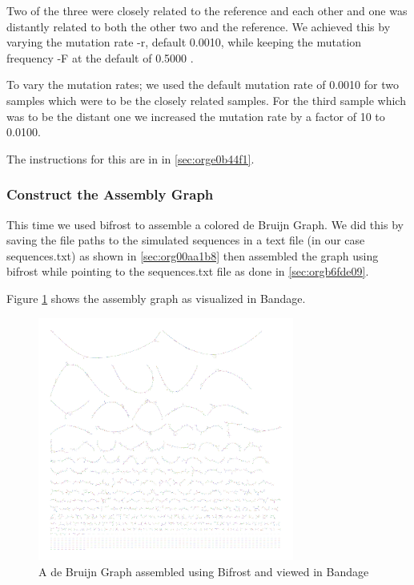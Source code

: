 \documentclass[10pt, a4paper]{article}
\begin{document}
Two of the three were closely related to the reference and each other and
one was distantly related to both the other two and the reference.
We achieved this by varying the mutation rate -r, default 0.0010, while keeping
the mutation frequency -F at the default of 0.5000
\cite{greenSuggestionsConcerningRelationship1995}.

To vary the mutation rates; we used the default mutation rate of 0.0010 for
two samples which were to be the closely related samples. 
For the third sample which was to be the distant one we increased the mutation 
rate by a factor of 10 to 0.0100. 

The instructions for this are in in \ref{sec:orge0b44f1}.

\subsubsection{Construct the Assembly Graph}
\label{sec:org19d5e97}
This time we used bifrost \cite{holleyBifrostHighlyParallel2019} to assemble a
colored de Bruijn Graph. 
We did this by saving the file paths to the simulated sequences in a text file
(in our case sequences.txt) as shown in \ref{sec:org00aa1b8} then assembled
the graph using bifrost  while pointing to the sequences.txt file as done in
\ref{sec:orgb6fde09}.

Figure \ref{fig:orgc5792ce} shows the assembly graph as visualized in Bandage.

\begin{figure}[h]
\centering
\includegraphics[width=0.75\textwidth]{../Figures/SARS_CoV_2/SARS_Assembly_Graph.png}
\caption[SARS-CoV-2 Assembly Graph]{\label{fig:orgc5792ce}
A de Bruijn Graph assembled using Bifrost and viewed in Bandage}
\end{figure}
\end{document}
